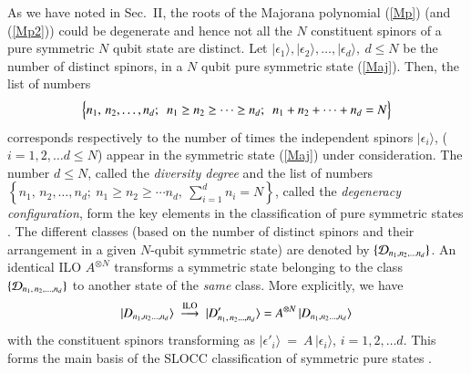 As we have noted in Sec.~II,  the roots of the Majorana polynomial (\ref{Mp}) (and (\ref{Mp2})) could be degenerate  and hence not all the  $N$ constituent spinors of a pure symmetric $N$ qubit state are distinct. Let $\vert \epsilon_1\rangle, \vert \epsilon_2\rangle,\ldots, \vert \epsilon_d\rangle,\ d\leq N$ be the number of distinct spinors, in a $N$ qubit pure symmetric state (\ref{Maj}).  Then, the list of numbers 
$$
\Bigl\{n_1,\,n_2,\ldots ,n_d;\ \ n_1\geq n_2\geq\cdots \geq n_d; \ \  n_1+n_2+\cdots+n_d=N\Bigr\}
$$ 
corresponds respectively to the number of times the independent spinors $\vert\epsilon_i\rangle$, ($i=1,2,\ldots d\leq N$) appear in the symmetric state (\ref{Maj}) under consideration. The number $d\leq N$, called the {\em diversity degree} and the list of numbers $\left\{n_1,\,n_2,\ldots ,n_d;\  n_1\geq n_2\geq \cdots n_d,\  \sum_{i=1}^{d} n_i=N\right\}$, called the {\em degeneracy configuration}, form the key elements in the classification of  pure symmetric states \cite{solano}. The different classes  (based on the number of distinct spinors and their arrangement in a given $N$-qubit symmetric state)  are denoted by $\{{\cal D}_{n_1,n_2,\ldots n_d}\}$. An identical ILO $A^{\otimes N}$ transforms a symmetric state belonging to the class $\{ {\cal D}_{n_1,\,n_2,\ldots, n_d}\}$ to another state of the {\em same} class. More explicitly, we have 
\begin{equation}
\vert D_{n_1,n_2\ldots, n_d}\rangle \ \stackrel{\rm  ILO}{\longrightarrow}\ \vert D'_{n_1,\,n_2\ldots, n_d}\rangle={A}^{\otimes N}\,\vert D_{n_1,n_2\ldots, n_d}\rangle\label{chap29-eq12}
\end{equation}  
with the constituent spinors transforming as 
$\vert\epsilon'_i\rangle~=~A\, \vert\epsilon_i\rangle$, $i=1,2,\ldots d$. This forms the main basis of the SLOCC classification of symmetric pure 
states \cite{solano}. 
